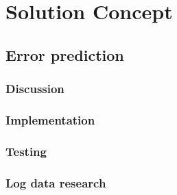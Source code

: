 \chapter{Solution Concept}
\section{Error prediction}
\subsection{Discussion}
\subsection{Implementation}
\subsection{Testing}
\subsection{Log data research}
